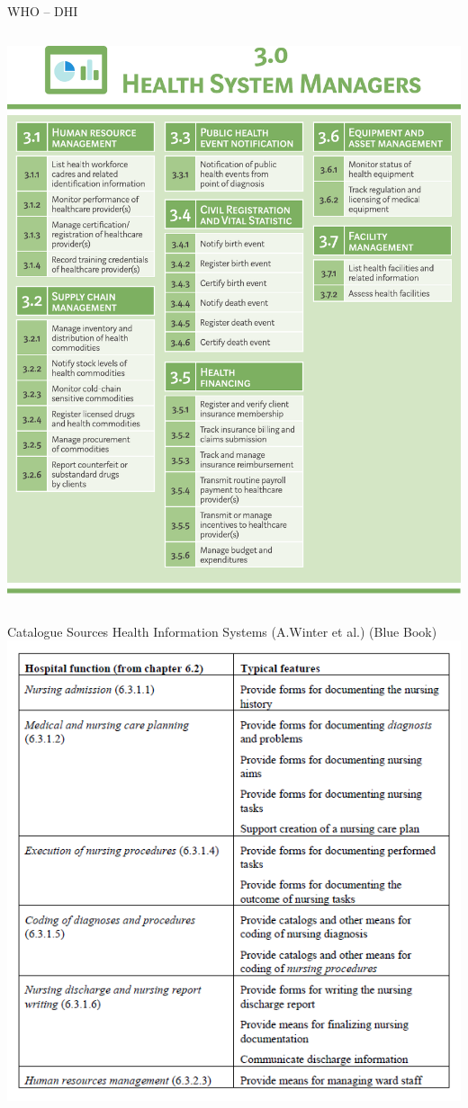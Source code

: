 \documentclass[aspectratio=1610,12pt]{beamer}
\newcommand{\enquote}[1]{{\glqq#1\grqq{}}}
\begin{document}
\begin{frame}{WHO -- DHI}
\begin{columns}
  \includegraphics[height=.8\textheight]{img/whodhi-managers.pdf}
\end{columns}
\end{frame}

\begin{frame}{Catalogue Sources}
  \centering
  \large Health Information Systems (A.Winter et al.) (\enquote{Blue Book})
  \includegraphics[height=.7\textheight]{img/bb-table.png}
\end{frame}
\end{document}
